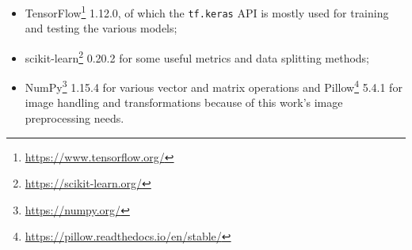 \begin{itemize}
    \item TensorFlow\footnote{\url{https://www.tensorflow.org/}} 1.12.0, of which the \verb|tf.keras| API is mostly used for training and testing the various models;
    \item scikit-learn\footnote{\url{https://scikit-learn.org/}} 0.20.2 for some useful metrics and data splitting methods;
    \item NumPy\footnote{\url{https://numpy.org/}} 1.15.4 for various vector and matrix operations and Pillow\footnote{\url{https://pillow.readthedocs.io/en/stable/}} 5.4.1 for image handling and transformations because of this work's image preprocessing needs.
\end{itemize}
